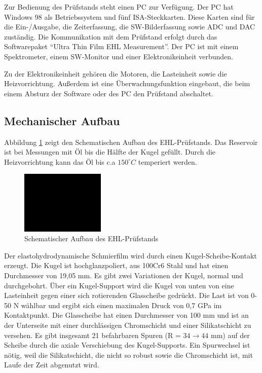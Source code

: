 Zur Bedienung des Prüfstands steht einen PC zur Verfügung.
Der PC hat Windows 98 als Betriebssystem und fünf ISA-Steckkarten.
Diese Karten sind für die Ein-/Ausgabe, die Zeiterfassung, die SW-Bilderfassung sowie ADC und DAC zuständig.
Die Kommunikation mit dem Prüfstand erfolgt durch das Softwarepaket ``Ultra Thin Film EHL Measurement''.
Der PC ist mit einem Spektrometer, einem SW-Monitor und einer Elektronikeinheit verbunden.

Zu der Elektronikeinheit gehören die Motoren, die Lasteinheit sowie die Heizvorrichtung.
Außerdem ist eine Überwachungsfunktion eingebaut, die beim einem Absturz der Software oder des PC den Prüfstand abschaltet.

\subsection{Mechanischer Aufbau}
\label{sub:mechanischer_aufbau}

Abbildung \ref{fig:ehl_aufbau} zeigt den Schematischen Aufbau des EHL-Prüfstands.
Das Reservoir ist bei Messungen mit Öl bis die Hälfte der Kugel gefüllt.
Durch die Heizvorrichtung kann das Öl bis c.a $150 ^\circ C$ temperiert werden.
\begin{figure}[htb]
    \centering
    \includegraphics[width=4cm]{./images/blank_img.jpg}
    \caption{Schematischer Aufbau des EHL-Prüfstands \cite{ehl}}
    \label{fig:ehl_aufbau}
\end{figure}
%
Der elastohydrodynamische Schmierfilm wird durch einen Kugel-Scheibe-Kontakt erzeugt.
Die Kugel ist hochglanzpoliert, aus 100Cr6 Stahl und hat einen Durchmesser von 19,05 mm.
Es gibt zwei Variationen der Kugel, normal und durchgebohrt.
Über ein Kugel-Support wird die Kugel von unten von eine Lasteinheit gegen einer sich rotierenden Glasscheibe gedrückt.
Die Last ist von 0-50 N wählbar und ergibt sich einen maximalen Druck von 0,7 GPa im Kontaktpunkt.
Die Glasscheibe hat einen Durchmesser von 100 mm und ist an der Unterseite mit einer durchlässigen Chromschicht und einer Silikatschicht zu versehen.
Es gibt insgesamt 21 befahrbaren Spuren (R = $34 \rightarrow 44$ mm) auf der Scheibe durch die axiale Verschiebung des Kugel-Supports.
Ein Spurwechsel ist nötig, weil die Silikatschicht, die nicht so robust sowie die Chromschicht ist, mit Laufe der Zeit abgenutzt wird.

